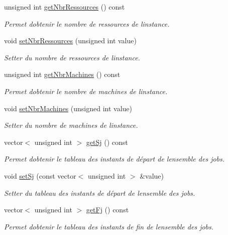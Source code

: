 \begin{DoxyCompactItemize}
unsigned int \hyperlink{classInstance_a79b49dcc3d590b823e41d8a223ecf25d}{get\+Nbr\+Ressources} () const
\begin{DoxyCompactList}\small\item\em Permet d\textquotesingle{}obtenir le nombre de ressources de l\textquotesingle{}instance. \end{DoxyCompactList}\item 
void \hyperlink{classInstance_aefc2e4c0a18ad899f99cad856a749358}{set\+Nbr\+Ressources} (unsigned int value)
\begin{DoxyCompactList}\small\item\em Setter du nombre de ressources de l\textquotesingle{}instance. \end{DoxyCompactList}\item 
unsigned int \hyperlink{classInstance_a2f985b9a7ce18fd8739ec589d9016003}{get\+Nbr\+Machines} () const
\begin{DoxyCompactList}\small\item\em Permet d\textquotesingle{}obtenir le nombre de machines de l\textquotesingle{}instance. \end{DoxyCompactList}\item 
void \hyperlink{classInstance_a7087e8d1d2a5a4d275472dc908a06381}{set\+Nbr\+Machines} (unsigned int value)
\begin{DoxyCompactList}\small\item\em Setter du nombre de machines de l\textquotesingle{}instance. \end{DoxyCompactList}\item 
vector$<$ unsigned int $>$ \hyperlink{classInstance_ab998bc8d9a8b03c8f6279573779217cc}{get\+Sj} () const
\begin{DoxyCompactList}\small\item\em Permet d\textquotesingle{}obtenir le tableau des instants de départ de l\textquotesingle{}ensemble des jobs. \end{DoxyCompactList}\item 
void \hyperlink{classInstance_af695a8a91368f2484ee7367b14144742}{set\+Sj} (const vector$<$ unsigned int $>$ \&value)
\begin{DoxyCompactList}\small\item\em Setter du tableau des instants de départ de l\textquotesingle{}ensemble des jobs. \end{DoxyCompactList}\item 
vector$<$ unsigned int $>$ \hyperlink{classInstance_af7b70cbd8670e4eb213fbd2b81eca6f0}{get\+Fj} () const
\begin{DoxyCompactList}\small\item\em Permet d\textquotesingle{}obtenir le tableau des instants de fin de l\textquotesingle{}ensemble des jobs. \end{DoxyCompactList}\item 

\end{DoxyCompactItemize}
